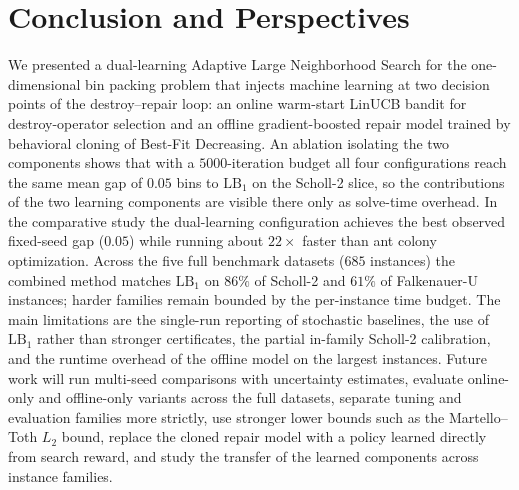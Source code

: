 \documentclass[conference]{IEEEtran}
\begin{document}
\section{Conclusion and Perspectives}\label{sec:conclusion}
We presented a dual-learning Adaptive Large Neighborhood Search for the
one-dimensional bin packing problem that injects machine learning at two decision
points of the destroy--repair loop: an online warm-start LinUCB bandit for
destroy-operator selection and an offline gradient-boosted repair model trained by
behavioral cloning of Best-Fit Decreasing. An ablation isolating the two
components shows that with a $5000$-iteration budget all four configurations
reach the same mean gap of $0.05$ bins to $\mathrm{LB}_1$ on the Scholl-2 slice,
so the contributions of the two learning components are visible there only as
solve-time overhead. In the comparative study the dual-learning configuration
achieves the best observed fixed-seed gap ($0.05$) while running about
$22\times$ faster than ant colony optimization. Across the five full benchmark
datasets ($685$ instances) the combined method matches $\mathrm{LB}_1$ on
$86\%$ of Scholl-2 and $61\%$ of Falkenauer-U instances; harder families remain
bounded by the per-instance time budget. The main limitations are the single-run
reporting of stochastic baselines, the use of $\mathrm{LB}_1$ rather than
stronger certificates, the partial in-family Scholl-2 calibration, and the
runtime overhead of the offline model on the largest instances. Future work will
run multi-seed comparisons with uncertainty estimates, evaluate online-only and
offline-only variants across the full datasets, separate tuning and evaluation
families more strictly, use stronger lower bounds such as the Martello--Toth
$L_2$ bound, replace the cloned repair model with a policy learned directly from
search reward, and study the transfer of the learned components across instance
families.
\end{document}
